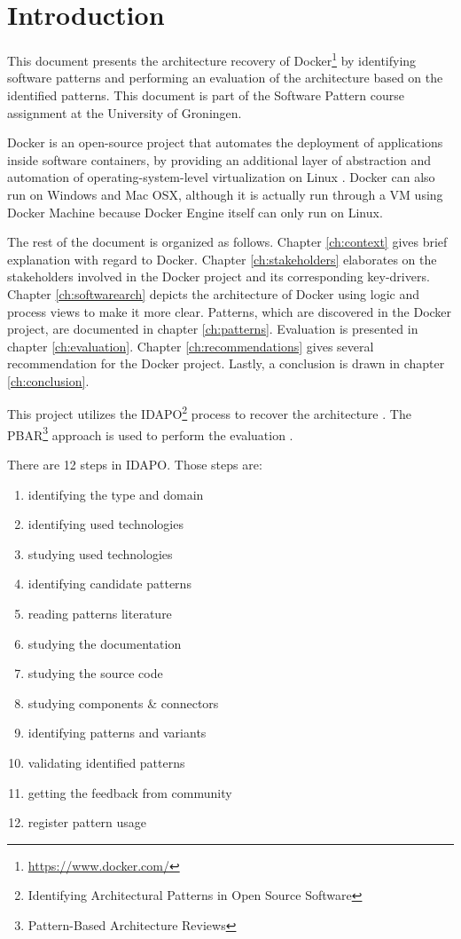 \clearpage
\chapter{Introduction}
\label{ch:introduction}
This document presents the architecture recovery of
Docker\footnote{\url{https://www.docker.com/}} by identifying software patterns
and performing an evaluation of the architecture based on the identified
patterns. This document is part of the Software Pattern course assignment at the
University of Groningen.

Docker is an open-source project that automates the deployment of applications
inside software containers, by providing an additional layer of abstraction and
automation of operating-system-level virtualization on Linux \cite{dockerdef}.
Docker can also run on Windows and Mac OSX, although it is actually run through
a VM using Docker Machine because Docker Engine itself can only run on Linux.

The rest of the document is organized as follows. Chapter \ref{ch:context}
gives brief explanation with regard to Docker. Chapter \ref{ch:stakeholders}
elaborates on the stakeholders involved in the Docker project and its
corresponding key-drivers. Chapter \ref{ch:softwarearch} depicts the
architecture of Docker using logic and process views to make it more clear.
Patterns, which are discovered in the Docker project, are documented in chapter
\ref{ch:patterns}. Evaluation is presented in chapter \ref{ch:evaluation}.
Chapter \ref{ch:recommendations} gives several recommendation for the Docker
project. Lastly, a conclusion is drawn in chapter \ref{ch:conclusion}.

This project utilizes the IDAPO\footnote{Identifying Architectural Patterns in
Open Source Software} process to recover the architecture \cite{idapo}. The
PBAR\footnote{Pattern-Based Architecture Reviews} approach is used to perform
the evaluation \cite{pbar}.

There are 12 steps in IDAPO. Those steps are:
\begin{enumerate}
\item identifying the type and domain
\item identifying used technologies
\item studying used technologies
\item identifying candidate patterns
\item reading patterns literature
\item studying the documentation
\item studying the source code
\item studying components \& connectors
\item identifying patterns and variants
\item validating identified patterns
\item getting the feedback from community
\item register pattern usage
\end{enumerate}

